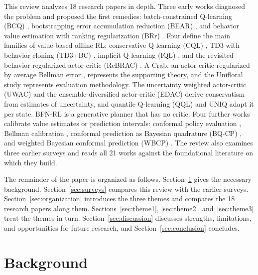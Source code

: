 \documentclass[conference]{IEEEtran}
\begin{document}
This review analyzes 18 research papers in depth. Three early works diagnosed the problem and proposed the first remedies: batch-constrained Q-learning (BCQ) \cite{fujimoto2019bcq}, bootstrapping error accumulation reduction (BEAR) \cite{kumar2019bear}, and behavior value estimation with ranking regularization (BRr) \cite{gulcehre2020brr}. Four define the main families of value-based offline RL: conservative Q-learning (CQL) \cite{kumar2020cql}, TD3 with behavior cloning (TD3+BC) \cite{fujimoto2021td3bc}, implicit Q-learning (IQL) \cite{kostrikov2022iql}, and the revisited behavior-regularized actor-critic (ReBRAC) \cite{tarasov2023rebrac}. A-Crab, an actor-critic regularized by average Bellman error \cite{zhu2023acrab}, represents the supporting theory, and the Unifloral study \cite{jackson2025unifloral} represents evaluation methodology. The uncertainty weighted actor-critic (UWAC) \cite{wu2021uwac} and the ensemble-diversified actor-critic (EDAC) \cite{an2021edac} derive conservatism from estimates of uncertainty, and quantile Q-learning (QQL) \cite{gao2026qql} and UNIQ \cite{upadhyay2026uniq} adapt it per state. BFN-RL \cite{killingberg2026bfn} is a generative planner that has no critic. Four further works calibrate value estimates or prediction intervals: conformal policy evaluation \cite{gan2025conformal}, Bellman calibration \cite{vanderlaan2026bellman}, conformal prediction as Bayesian quadrature (BQ-CP) \cite{snell2025bqcp}, and weighted Bayesian conformal prediction (WBCP) \cite{lou2026wbcp}. The review also examines three earlier surveys \cite{levine2020tutorial,he2023survey,prudencio2024survey} and reads all 21 works against the foundational literature on which they build.

The remainder of the paper is organized as follows. Section~\ref{sec:background} gives the necessary background. Section~\ref{sec:surveys} compares this review with the earlier surveys. Section~\ref{sec:organization} introduces the three themes and compares the 18 research papers along them. Sections~\ref{sec:theme1}, \ref{sec:theme2}, and~\ref{sec:theme3} treat the themes in turn. Section~\ref{sec:discussion} discusses strengths, limitations, and opportunities for future research, and Section~\ref{sec:conclusion} concludes.

\section{Background}
\label{sec:background}
\end{document}
